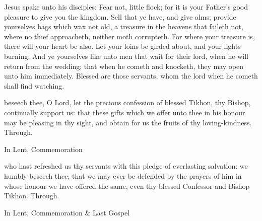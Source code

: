 
 Jesus spake unto his disciples: Fear not, little flock; for it is your Father's good pleasure to give you the kingdom. Sell that ye have, and give alms; provide yourselves bags which wax not old, a treasure in the heavens that faileth not, where no thief approacheth, neither moth corrupteth. For where your treasure is, there will your heart be also. Let your loins be girded about, and your lights burning; And ye yourselves like unto men that wait for their lord, when he will return from the wedding; that when he cometh and knocketh, they may open unto him immediately. Blessed are those servants, whom the lord when he cometh shall find watching.


\secret
{} beseech thee, O Lord, let the precious confession of blessed Tikhon, thy Bishop, continually support us: that these gifts which we offer unto thee in his honour may be pleasing in thy sight, and obtain for us the fruits of thy loving-kindness. Through.

\begin{rubric}
    In Lent, Commemoration %
\end{rubric}


\postcommunion
{} who hast refreshed us thy servants with this pledge of everlasting salvation: we humbly beseech thee; that we may ever be defended by the prayers of him in whose honour we have offered the same, even thy blessed Confessor and Bishop Tikhon. Through.

\begin{rubric}
    In Lent, Commemoration \& Last Gospel 
\end{rubric}


%


